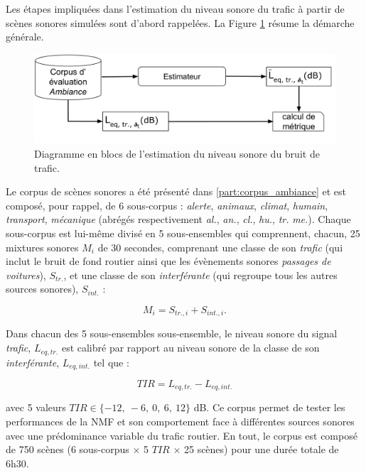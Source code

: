 Les étapes impliquées dans l'estimation du niveau sonore du trafic à partir de scènes sonores simulées sont d'abord rappelées. La Figure \ref{fig:rappel_estimateur} résume la démarche générale.

\begin{figure}[ht]
\centering
\includegraphics[width=.8\linewidth]{./figures/NMF/Bloc_diagram_estimateur_FR.pdf}
\caption{Diagramme en blocs de l'estimation du niveau sonore du bruit de trafic.}
\label{fig:rappel_estimateur}
\end{figure}

Le corpus de scènes sonores a été présenté dans \ref{part:corpus_ambiance} et est composé, pour rappel, de 6 sous-corpus : \textit{alerte}, \textit{animaux}, \textit{climat}, \textit{humain}, \textit{transport}, \textit{mécanique} (abrégés respectivement \textit{al.}, \textit{an.}, \textit{cl.}, \textit{hu.}, \textit{tr.} \textit{me.}). Chaque sous-corpus est lui-même divisé en 5 sous-ensembles qui comprennent, chacun, 25 mixtures sonores $M_i$ de 30 secondes, comprenant une classe de son \textit{trafic} (qui inclut le bruit de fond routier ainsi que les évènements sonores \textit{passages de voitures}), $S_{tr.}$, et une classe de son \textit{interférante} (qui regroupe tous les autres sources sonores), $S_{int.}$ :

\begin{equation}
M_i = S_{tr.,i}+S_{int.,i}.
\end{equation}

Dans chacun des 5 sous-ensembles sous-ensemble, le niveau sonore du signal \textit{trafic}, $L_{eq,tr.}$ est calibré par rapport au niveau sonore de la classe de son \textit{interférante}, $L_{eq,int.}$ tel que :

\begin{equation}
TIR = L_{eq,tr.} - L_{eq,int.}
\end{equation}

avec 5 valeurs $TIR \in \lbrace -12,~-6,~0,~6,~12 \rbrace$ dB. Ce corpus permet de tester les performances de la NMF et son comportement face à différentes sources sonores avec une prédominance variable du trafic routier. En tout, le corpus est composé de 750 scènes (6 sous-corpus $\times$ 5 $TIR$ $\times$ 25 scènes) pour une durée totale de 6h30.

